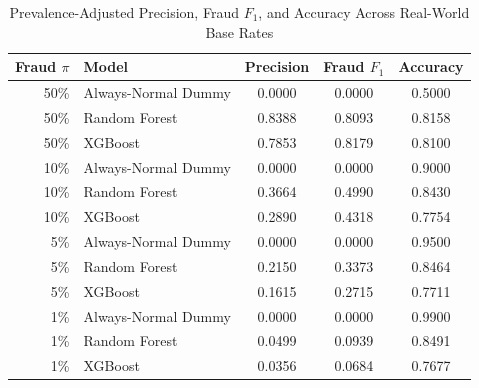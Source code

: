 \begin{table}[!htbp]
\centering
\caption{Prevalence-Adjusted Precision, Fraud $F_1$, and Accuracy Across Real-World Base Rates}
\label{tab:prevalence}
\footnotesize
\begin{tabularx}{\linewidth}{r l c c c}
\toprule
\textbf{Fraud $\pi$} & \textbf{Model} & \textbf{Precision} & \textbf{Fraud $F_1$} & \textbf{Accuracy} \\
\midrule
50\% & Always-Normal Dummy & 0.0000 & 0.0000 & 0.5000 \\
50\% & Random Forest & 0.8388 & 0.8093 & 0.8158 \\
50\% & XGBoost & 0.7853 & 0.8179 & 0.8100 \\
10\% & Always-Normal Dummy & 0.0000 & 0.0000 & 0.9000 \\
10\% & Random Forest & 0.3664 & 0.4990 & 0.8430 \\
10\% & XGBoost & 0.2890 & 0.4318 & 0.7754 \\
5\% & Always-Normal Dummy & 0.0000 & 0.0000 & 0.9500 \\
5\% & Random Forest & 0.2150 & 0.3373 & 0.8464 \\
5\% & XGBoost & 0.1615 & 0.2715 & 0.7711 \\
1\% & Always-Normal Dummy & 0.0000 & 0.0000 & 0.9900 \\
1\% & Random Forest & 0.0499 & 0.0939 & 0.8491 \\
1\% & XGBoost & 0.0356 & 0.0684 & 0.7677 \\
\bottomrule
\end{tabularx}
\end{table}